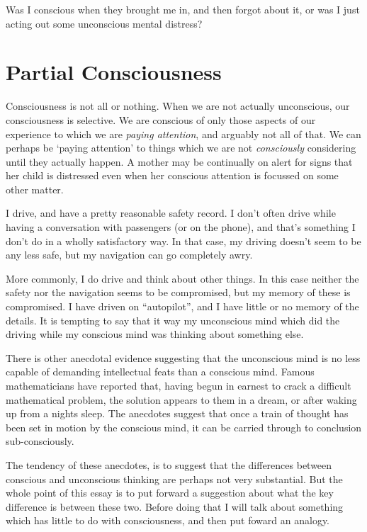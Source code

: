 \documentclass[10pt,titlepage]{article}
\begin{document}
Was I conscious when they brought me in, and then forgot about it, or was I just acting out some unconscious mental distress?

\section{Partial Consciousness}

Consciousness is not all or nothing.
When we are not actually unconscious, our consciousness is selective.
We are conscious of only those aspects of our experience to which we are \emph{paying attention}, and arguably not all of that.
We can perhaps be `paying attention' to things which we are not {\it consciously} considering until they actually happen.
A mother may be continually on alert for signs that her child is distressed even when her conscious attention is focussed on some other matter.

I drive, and have a pretty reasonable safety record.
I don't often drive while having a conversation with passengers (or on the phone), and that's something I don't do in a wholly satisfactory way.
In that case, my driving doesn't seem to be any less safe, but my navigation can go completely awry.

More commonly, I do drive and think about other things.
In this case neither the safety nor the navigation seems to be compromised, but my memory of these is compromised.
I have driven on ``autopilot'', and I have little or no memory of the details.
It is tempting to say that it way my unconscious mind which did the driving while my conscious mind was thinking about something else.

There is other anecdotal evidence suggesting that the unconscious mind is no less capable of demanding intellectual feats than a conscious mind.
Famous mathematicians have reported that, having begun in earnest to crack a difficult mathematical problem, the solution appears to them in a dream, or after waking up from a nights sleep.
The anecdotes suggest that once a train of thought has been set in motion by the conscious mind, it can be carried through to conclusion sub-consciously.

The tendency of these anecdotes, is to suggest that the differences between conscious and unconscious thinking are perhaps not very substantial.
But the whole point of this essay is to put forward a suggestion about what the key difference is between these two.
Before doing that I will talk about something which has little to do with consciousness, and then put foward an analogy.
\end{document}
